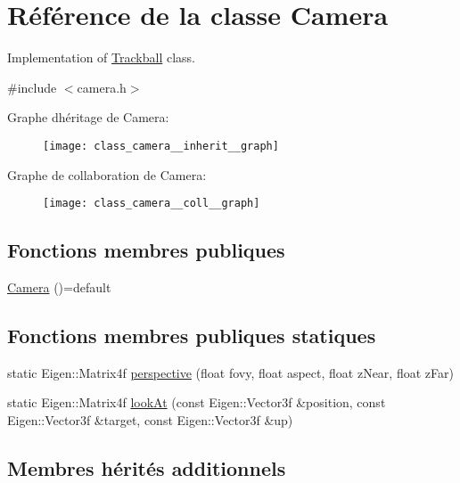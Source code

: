 \hypertarget{class_camera}{}\section{Référence de la classe Camera}
\label{class_camera}


Implementation of \hyperlink{class_trackball}{Trackball} class.  




{\ttfamily \#include $<$camera.\+h$>$}



Graphe d\textquotesingle{}héritage de Camera\+:
\nopagebreak
\begin{figure}[H]
\begin{center}
\leavevmode
\texttt{[image: class\_camera\_\_inherit\_\_graph]}
\end{center}
\end{figure}


Graphe de collaboration de Camera\+:
\nopagebreak
\begin{figure}[H]
\begin{center}
\leavevmode
\texttt{[image: class\_camera\_\_coll\_\_graph]}
\end{center}
\end{figure}
\subsection*{Fonctions membres publiques}
\begin{DoxyCompactItemize}
\item 
\hyperlink{class_camera_ae23af4d7cab430c77d537621cdd16b3f}{Camera} ()=default
\end{DoxyCompactItemize}
\subsection*{Fonctions membres publiques statiques}
\begin{DoxyCompactItemize}
\item 
static Eigen\+::\+Matrix4f \hyperlink{class_camera_aa63f48a3280871eba3a6f74a3c0f2e2e}{perspective} (float fovy, float aspect, float z\+Near, float z\+Far)
\item 
static Eigen\+::\+Matrix4f \hyperlink{class_camera_a683a2e432969a485412c28e18567c174}{look\+At} (const Eigen\+::\+Vector3f \&position, const Eigen\+::\+Vector3f \&target, const Eigen\+::\+Vector3f \&up)
\end{DoxyCompactItemize}
\subsection*{Membres hérités additionnels}


